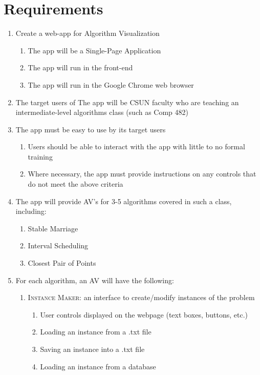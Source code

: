 \section{Requirements}
\label{requirements}
\begin{enumerate}
	\item Create a web-app for Algorithm Visualization 
	\begin{enumerate}
		\item The app will be a Single-Page Application
		\item The app will run in the front-end
		\item The app will run in the Google Chrome web browser
	\end{enumerate}
	\item The target users of The app will be CSUN faculty 
	who are teaching an intermediate-level 
	algorithms class (such as Comp 482)
	\item The app must be easy to use by its target users
	\begin{enumerate}
		\item Users should be able to interact with the app with 
			little to no formal training
		\item Where necessary, the app must provide instructions on 
			any controls that do not meet the above criteria
	\end{enumerate}
	\item The app will provide AV's for 3-5 algorithms 
		covered in such a class, including: 
		\begin{enumerate}
			\item Stable Marriage
			\item Interval Scheduling
			\item Closest Pair of Points
		\end{enumerate}
	\item For each algorithm, an AV will have the following:
	\begin{enumerate}
		\item \textsc{Instance Maker}: an interface to create/modify instances of the problem
		\begin{enumerate}
			\item User controls displayed on the webpage (text boxes, buttons, etc.)
			\item Loading an instance from a .txt file\label{req-load}
			\item Saving an instance into a .txt file\label{req-save}
			\item Loading an instance from a database

\end{enumerate}
\end{enumerate}
\end{enumerate}
